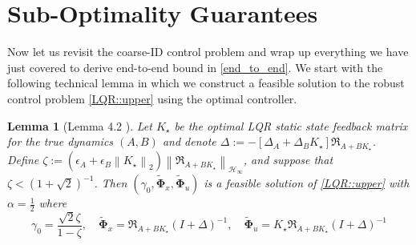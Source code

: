 \documentclass{article}[12pt]
\newtheorem{lemma}{Lemma}
\begin{document}
\section{Sub-Optimality Guarantees}
Now let us revisit the coarse-ID control problem and wrap up everything we have just covered to derive end-to-end bound in \eqref{end_to_end}.
We start with the following technical lemma in which we construct a feasible solution to the robust control problem \eqref{LQR::upper} using the optimal controller.

\begin{lemma}[Lemma 4.2 \cite{dean2017sample}]
\label{lem::feas}
Let $K_\star$ be the optimal LQR static state feedback matrix for the true dynamics $(A,B)$ and denote $\Delta:=-\left[\Delta_{A}+\Delta_{B} K_{\star}\right] \Re_{A+B K_\star}$.
Define $\zeta:=\left(\epsilon_{A}+\epsilon_{B}\left\|K_{\star}\right\|_{2}\right)\left\|\mathfrak{R}_{A+B K_{\star}}\right\|_{ \mathcal{H}_{\infty}}$, and suppose that $\zeta<(1+\sqrt{2})^{-1}$. Then $\left(\gamma_{0}, \tilde{\mathbf{\Phi}}_{x}, \tilde{\mathbf{\Phi}}_{u}\right)$ is a feasible solution of \eqref{LQR::upper} with $\alpha = \frac{1}{2}$ where
\begin{equation}
    \gamma_{0}=\frac{\sqrt{2} \zeta}{1-\zeta}, \quad \tilde{\mathbf{\Phi}}_{x}=\Re_{A+B K_{\star}}(I+\Delta)^{-1}, \quad \tilde{\mathbf{\Phi}}_{u}=K_{\star} \Re_{A+B K_{\star}}(I+\Delta)^{-1}
\end{equation}
\end{lemma}
\end{document}
